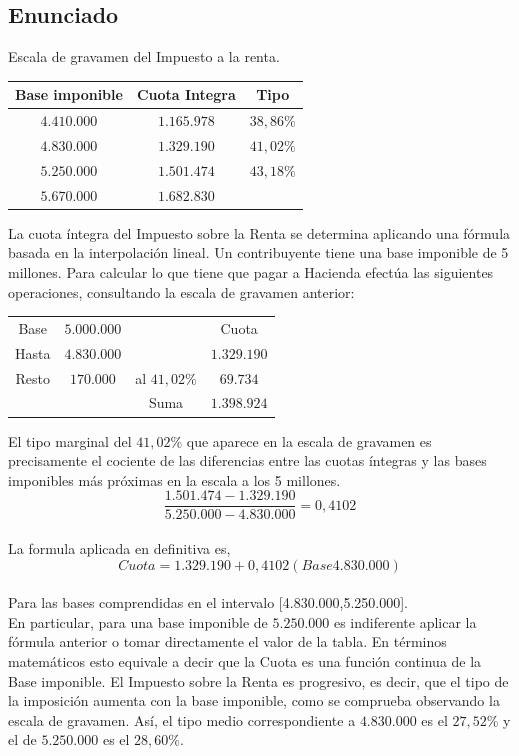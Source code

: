 \documentclass[10pt,letterpaper]{article}
\begin{document}
	\subsection{Enunciado}
	Escala de gravamen del Impuesto a la renta.\\
	\begin{center}
		\begin{tabular}{|c|c|c|}
			\hline
			Base imponible & Cuota Integra & Tipo\\ \hline
			$4.410.000$ & $1.165.978$ & $38,86\%$ \\ 
			$4.830.000$ & $1.329.190$ & $41,02\%$ \\
			$5.250.000$ & $1.501.474$ & $43,18\%$ \\
			$5.670.000$ & $1.682.830$ &			  \\ \hline
		\end{tabular}
	\end{center}
	La cuota íntegra del Impuesto sobre la Renta se determina aplicando una fórmula basada en la interpolación lineal. Un contribuyente tiene una base imponible de 5 millones. Para calcular lo que tiene que pagar a Hacienda efectúa las siguientes operaciones, consultando la escala de gravamen anterior:\\
	\begin{center}
		\begin{tabular}{c c c c}
			Base & $5.000.000$& & Cuota \\
			Hasta & $4.830.000$& & $1.329.190$ \\
			Resto & $170.000$ & al $41,02\%$ & $69.734$\\
				  & 		  & Suma & $1.398.924$
		\end{tabular}
	\end{center} 
	El tipo marginal del $41,02\%$ que aparece en la escala de gravamen es precisamente el cociente de las diferencias entre las cuotas íntegras y las bases imponibles más próximas en la escala a los 5 millones.
	$$\frac{1.501.474 - 1.329.190}{5.250.000 - 4.830.000}=0,4102$$ \\
	La  formula aplicada en definitiva es,
	$$Cuota=1.329.190 + 0,4102(Base 4.830.000)$$\\
	Para las bases comprendidas en el intervalo [4.830.000,5.250.000].\\
	En particular, para una base imponible de $5.250.000$ es indiferente aplicar la fórmula anterior o tomar directamente el valor de la tabla. En términos matemáticos esto equivale a decir que la Cuota es una función continua de la Base imponible. El Impuesto sobre la Renta es progresivo, es decir, que el tipo de la imposición aumenta con la base imponible, como se comprueba observando la escala de gravamen. Así, el tipo medio correspondiente a $4.830.000$ es el $27,52\%$ y el de $5.250.000$ es el $28,60\%$.\\\\
\end{document}
